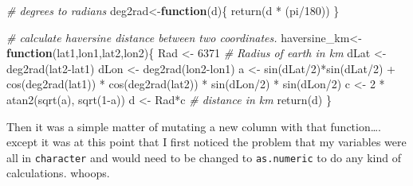 \documentclass[]{tufte-handout}
\newenvironment{Shaded}{}{}
\newcommand{\CommentTok}[1]{\textcolor[rgb]{0.38,0.63,0.69}{\textit{#1}}}
\newcommand{\ControlFlowTok}[1]{\textcolor[rgb]{0.00,0.44,0.13}{\textbf{#1}}}
\newcommand{\DecValTok}[1]{\textcolor[rgb]{0.25,0.63,0.44}{#1}}
\newcommand{\FunctionTok}[1]{\textcolor[rgb]{0.02,0.16,0.49}{#1}}
\newcommand{\NormalTok}[1]{#1}
\newcommand{\OtherTok}[1]{\textcolor[rgb]{0.00,0.44,0.13}{#1}}
\newcommand{\SpecialCharTok}[1]{\textcolor[rgb]{0.25,0.44,0.63}{#1}}
\begin{document}
\begin{Shaded}
\begin{Highlighting}[]
\CommentTok{\# degrees to radians}
\NormalTok{deg2rad}\OtherTok{\textless{}{-}}\ControlFlowTok{function}\NormalTok{(d)\{}
  \FunctionTok{return}\NormalTok{(d }\SpecialCharTok{*}\NormalTok{ (pi}\SpecialCharTok{/}\DecValTok{180}\NormalTok{))}
\NormalTok{\}}

\CommentTok{\# calculate haversine distance between two coordinates. }
\NormalTok{haversine\_km}\OtherTok{\textless{}{-}}\ControlFlowTok{function}\NormalTok{(lat1,lon1,lat2,lon2)\{}
\NormalTok{  Rad }\OtherTok{\textless{}{-}} \DecValTok{6371} \CommentTok{\# Radius of earth in km}
\NormalTok{  dLat }\OtherTok{\textless{}{-}} \FunctionTok{deg2rad}\NormalTok{(lat2}\SpecialCharTok{{-}}\NormalTok{lat1)}
\NormalTok{  dLon }\OtherTok{\textless{}{-}} \FunctionTok{deg2rad}\NormalTok{(lon2}\SpecialCharTok{{-}}\NormalTok{lon1)}
\NormalTok{  a }\OtherTok{\textless{}{-}} \FunctionTok{sin}\NormalTok{(dLat}\SpecialCharTok{/}\DecValTok{2}\NormalTok{)}\SpecialCharTok{*}\FunctionTok{sin}\NormalTok{(dLat}\SpecialCharTok{/}\DecValTok{2}\NormalTok{) }\SpecialCharTok{+} \FunctionTok{cos}\NormalTok{(}\FunctionTok{deg2rad}\NormalTok{(lat1)) }\SpecialCharTok{*} \FunctionTok{cos}\NormalTok{(}\FunctionTok{deg2rad}\NormalTok{(lat2)) }\SpecialCharTok{*} \FunctionTok{sin}\NormalTok{(dLon}\SpecialCharTok{/}\DecValTok{2}\NormalTok{) }\SpecialCharTok{*} \FunctionTok{sin}\NormalTok{(dLon}\SpecialCharTok{/}\DecValTok{2}\NormalTok{)}
\NormalTok{  c }\OtherTok{\textless{}{-}} \DecValTok{2} \SpecialCharTok{*} \FunctionTok{atan2}\NormalTok{(}\FunctionTok{sqrt}\NormalTok{(a), }\FunctionTok{sqrt}\NormalTok{(}\DecValTok{1}\SpecialCharTok{{-}}\NormalTok{a))}
\NormalTok{  d }\OtherTok{\textless{}{-}}\NormalTok{ Rad}\SpecialCharTok{*}\NormalTok{c }\CommentTok{\# distance in km}
  \FunctionTok{return}\NormalTok{(d)}
\NormalTok{\}}
\end{Highlighting}
\end{Shaded}

Then it was a simple matter of mutating a new column with that
function\ldots. except it was at this point that I first noticed the
problem that my variables were all in \texttt{character} and would need
to be changed to \texttt{as.numeric} to do any kind of calculations.
whoops.
\end{document}
